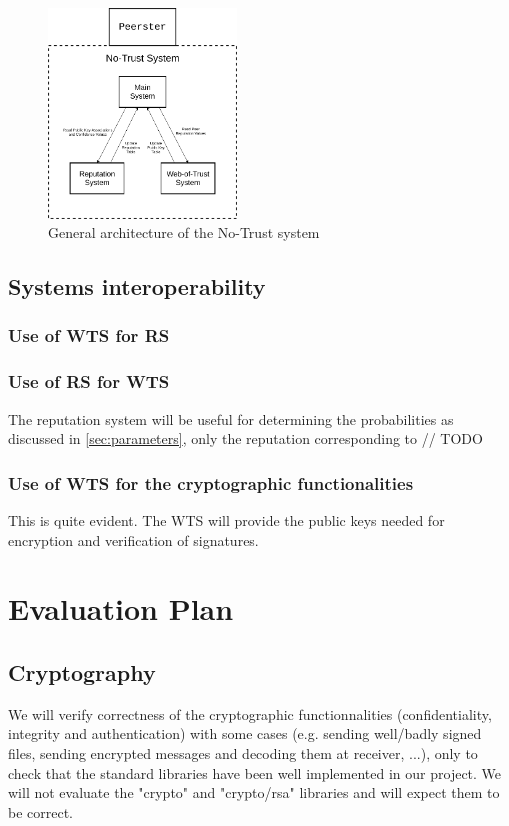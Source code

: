 \documentclass[]{article}
\begin{document}
        \begin{figure}[h]
        	\includegraphics[width=50mm]{no-trust-arch}
        	\centering
        	\caption{General architecture of the No-Trust system}
        	\label{fig:no-trust-arch}
        \end{figure}
        
        \subsection{Systems interoperability}
        
        \subsubsection{Use of WTS for RS}
        
        \subsubsection{Use of RS for WTS}
        The reputation system will be useful for determining the probabilities as discussed in \ref{sec:parameters}, only the reputation corresponding to // TODO
        
        \subsubsection{Use of WTS for the cryptographic functionalities}
        This is quite evident. The WTS will provide the public keys needed for encryption and verification of signatures.
        
    \section{Evaluation Plan}
        
        \subsection{Cryptography}
        \label{sec:crypt-test}
        We will verify correctness of the cryptographic functionnalities (confidentiality, integrity and authentication) with some cases (e.g. sending well/badly signed files, sending encrypted messages and decoding them at receiver, ...), only to check that the standard libraries have been well implemented in our project. We will not evaluate the "crypto" and "crypto/rsa" libraries and will expect them to be correct.
        
\end{document}
